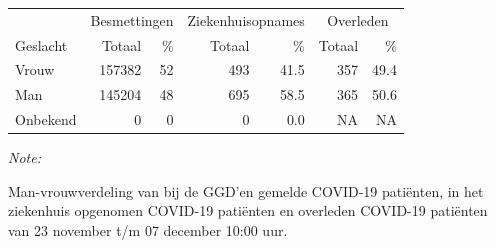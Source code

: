 \documentclass[
  english,
  man,floatsintext]{apa6}
\begin{document}
\newpage

\begin{table}
\centering\begingroup\fontsize{11}{13}\selectfont

\begin{threeparttable}
\begin{tabular}{lrrrrrr}
\toprule
\multicolumn{1}{c}{ } & \multicolumn{2}{c}{Besmettingen} & \multicolumn{2}{c}{Ziekenhuisopnames} & \multicolumn{2}{c}{Overleden} \\
\cmidrule(l{3pt}r{3pt}){2-3} \cmidrule(l{3pt}r{3pt}){4-5} \cmidrule(l{3pt}r{3pt}){6-7}
Geslacht & Totaal & \% & Totaal & \% & Totaal & \%\\
\midrule
Vrouw & 157382 & 52 & 493 & 41.5 & 357 & 49.4\\
Man & 145204 & 48 & 695 & 58.5 & 365 & 50.6\\
Onbekend & 0 & 0 & 0 & 0.0 & NA & NA\\
\bottomrule
\end{tabular}
\begin{tablenotes}
\item \textit{Note: } 
\item Man-vrouwverdeling van bij de GGD’en gemelde COVID-19 patiënten, in het ziekenhuis opgenomen COVID-19 patiënten en overleden COVID-19 patiënten van 23 november t/m 07 december 10:00 uur.
\end{tablenotes}
\end{threeparttable}
\endgroup{}
\end{table}
\newpage
\end{document}
